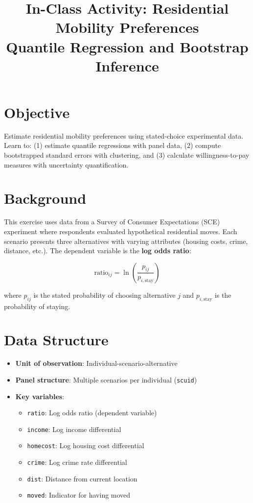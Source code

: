 \documentclass[12pt]{article}
\title{In-Class Activity: Residential Mobility Preferences\\\large{Quantile Regression and Bootstrap Inference}}
\author{}
\date{}
\begin{document}
\maketitle

\section{Objective}

Estimate residential mobility preferences using stated-choice experimental data. Learn to: (1) estimate quantile regressions with panel data, (2) compute bootstrapped standard errors with clustering, and (3) calculate willingness-to-pay measures with uncertainty quantification.

\section{Background}

This exercise uses data from a Survey of Consumer Expectations (SCE) experiment where respondents evaluated hypothetical residential moves. Each scenario presents three alternatives with varying attributes (housing costs, crime, distance, etc.). The dependent variable is the \textbf{log odds ratio}:

$$\text{ratio}_{ij} = \ln\left(\frac{p_{ij}}{p_{i,\text{stay}}}\right)$$

where $p_{ij}$ is the stated probability of choosing alternative $j$ and $p_{i,\text{stay}}$ is the probability of staying.

\section{Data Structure}

\begin{itemize}
    \item \textbf{Unit of observation}: Individual-scenario-alternative
    \item \textbf{Panel structure}: Multiple scenarios per individual (\texttt{scuid})
    \item \textbf{Key variables}:
    \begin{itemize}
        \item \texttt{ratio}: Log odds ratio (dependent variable)
        \item \texttt{income}: Log income differential
        \item \texttt{homecost}: Log housing cost differential
        \item \texttt{crime}: Log crime rate differential
        \item \texttt{dist}: Distance from current location
        \item \texttt{moved}: Indicator for having moved
    \end{itemize}
\end{itemize}
\end{document}
